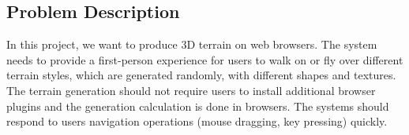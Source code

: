 \subsection{Problem Description}
In this project, we want to produce 3D terrain on web browsers. The system needs to provide a first-person experience for users to walk on or fly over different terrain styles, which are generated randomly, with different shapes and textures. The terrain generation should not require users to install additional browser plugins and the generation calculation is done in browsers. The systems should respond to users navigation operations (mouse dragging, key pressing) quickly.
